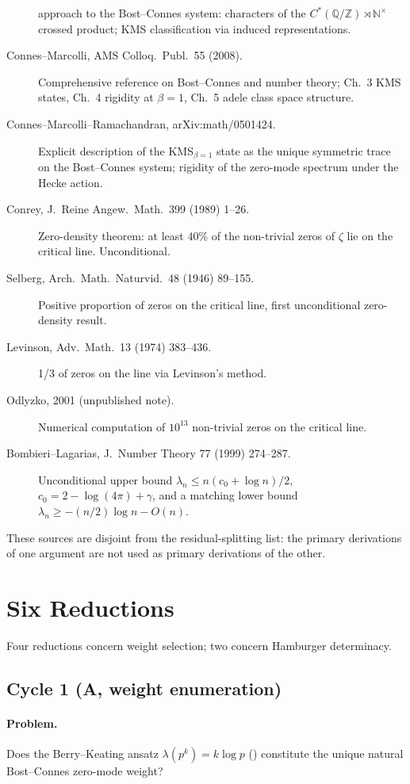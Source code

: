 \begin{description}
approach to the Bost--Connes system: characters of the
\(C^{*}(\mathbb{Q}/\mathbb{Z})\rtimes\mathbb{N}^{\times}\) crossed
product; KMS classification via induced representations.
\item[Connes--Marcolli, AMS Colloq.~Publ.~55 (2008).] Comprehensive
reference on Bost--Connes and number theory; Ch.~3 KMS states,
Ch.~4 rigidity at \(\beta=1\), Ch.~5 adele class space structure.
\item[Connes--Marcolli--Ramachandran, arXiv:math/0501424.] Explicit
description of the KMS\({}_{\beta=1}\) state as the unique symmetric
trace on the Bost--Connes system; rigidity of the zero-mode spectrum
under the Hecke action.
\item[Conrey, J.~Reine Angew.~Math.~399 (1989) 1--26.] Zero-density
theorem: at least 40\% of the non-trivial zeros of \(\zeta\) lie on the
critical line. Unconditional.
\item[Selberg, Arch.~Math.~Naturvid.~48 (1946) 89--155.] Positive
proportion of zeros on the critical line, first unconditional
zero-density result.
\item[Levinson, Adv.~Math.~13 (1974) 383--436.] 1/3 of zeros on the
line via Levinson's method.
\item[Odlyzko, 2001 (unpublished note).] Numerical computation of
\(10^{13}\) non-trivial zeros on the critical line.
\item[Bombieri--Lagarias, J.~Number Theory 77 (1999) 274--287.]
Unconditional upper bound
\(\lambda_{n}\leq n(c_{0}+\log n)/2\), \(c_{0}=2-\log(4\pi)+\gamma\), and
a matching lower bound \(\lambda_{n}\geq -(n/2)\log n-O(n)\).
\end{description}

These sources are disjoint from the residual-splitting list:
the primary derivations of one argument are not used as primary
derivations of the other.

\section{Six Reductions}
\label{v4-arith:hpar-det:table}

Four reductions concern weight selection; two concern Hamburger
determinacy.

\subsection{Cycle 1 (A, weight enumeration)}
\label{v4-arith:hpar-det:cycle-1}

\paragraph{Problem.} Does the Berry--Keating ansatz
\(\lambda(p^{k})=k\log p\)
() constitute the unique
natural Bost--Connes zero-mode weight?

